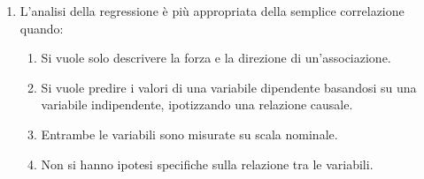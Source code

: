 \documentclass[12pt, a4paper]{article}
\begin{document}
\begin{enumerate}[resume]
    \item L'analisi della regressione è più appropriata della semplice correlazione quando:
    \begin{enumerate}
        \item Si vuole solo descrivere la forza e la direzione di un'associazione.
        \item Si vuole predire i valori di una variabile dipendente basandosi su una variabile indipendente, ipotizzando una relazione causale.
        \item Entrambe le variabili sono misurate su scala nominale.
        \item Non si hanno ipotesi specifiche sulla relazione tra le variabili.
    \end{enumerate}
    \vspace{0.3cm}
\end{enumerate}

\end{document}
